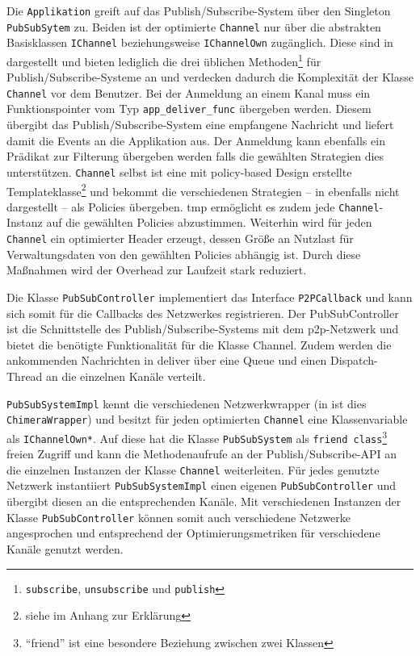 Die \texttt{Applikation} greift auf das Publish/Subscribe-System über den Singleton \texttt{PubSub\-Sytem} zu. Beiden ist der optimierte \texttt{Channel} nur über die abstrakten Basisklassen \texttt{IChannel} beziehungsweise \texttt{IChannelOwn} zugänglich. Diese sind in  dargestellt und bieten lediglich die drei üblichen Methoden\footnote{\texttt{subscribe}, \texttt{unsubscribe} und \texttt{publish}} für Publish/Subscribe-Systeme an und verdecken dadurch die Komplexität der Klasse \texttt{Channel} vor dem Benutzer. Bei der Anmeldung an einem Kanal muss ein Funktionspointer vom Typ \texttt{app\_deliver\_func} übergeben werden. Diesem übergibt das Publish/Subscribe-System eine empfangene Nachricht und liefert damit die Events an die Applikation aus. Der Anmeldung kann ebenfalls ein Prädikat zur Filterung übergeben werden falls die gewählten Strategien dies unterstützen. \texttt{Channel} selbst ist eine mit policy-based Design erstellte Templateklasse\footnote{siehe  im Anhang zur Erklärung} und bekommt die verschiedenen Strategien -- in  ebenfalls nicht dargestellt -- als Policies übergeben. \ac{tmp} ermöglicht es zudem jede \texttt{Channel}-Instanz auf die gewählten Policies abzustimmen. Weiterhin wird für jeden \texttt{Channel} ein optimierter Header erzeugt, dessen Größe an Nutzlast für Verwaltungsdaten von den gewählten Policies abhängig ist. Durch diese Maßnahmen wird der Overhead zur Laufzeit stark reduziert. 



Die Klasse \texttt{PubSubController} implementiert das Interface \texttt{P2PCallback} und kann sich somit für die Callbacks des Netzwerkes registrieren. Der PubSubController ist die Schnittstelle des Publish/Subscribe-Systems mit dem \ac{p2p}-Netzwerk und bietet die benötigte Funktionalität für die Klasse Channel. Zudem werden die ankommenden Nachrichten in deliver über eine Queue und einen Dispatch-Thread an die einzelnen Kanäle verteilt. 

\texttt{PubSubSystemImpl} kennt die verschiedenen Netzwerkwrapper (in  ist dies \texttt{ChimeraWrapper}) und besitzt für jeden optimierten \texttt{Channel} eine Klassenvariable als \texttt{IChannelOwn*}. Auf diese hat die Klasse \texttt{PubSubSystem} als \texttt{friend class}\footnote{\enquote{friend} ist eine besondere Beziehung zwischen zwei Klassen} freien Zugriff und kann die Methodenaufrufe an der Publish/Subscribe-API an die einzelnen Instanzen der Klasse \texttt{Channel} weiterleiten. Für jedes genutzte Netzwerk instantiiert \texttt{PubSubSystemImpl} einen eigenen \texttt{PubSubController} und übergibt diesen an die entsprechenden Kanäle. Mit verschiedenen Instanzen der Klasse \texttt{PubSubController} können somit auch verschiedene Netzwerke angesprochen und entsprechend der Optimierungsmetriken für verschiedene Kanäle genutzt werden.

